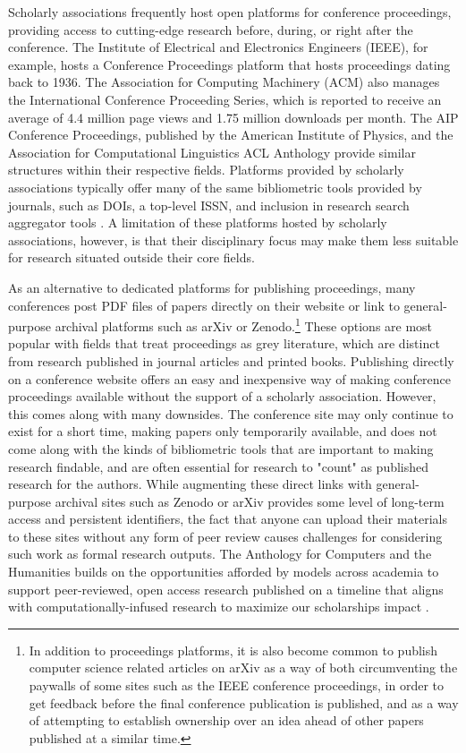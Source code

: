 \documentclass[final]{anthology-ch} %
\begin{document}
Scholarly associations frequently host open platforms for conference
proceedings, providing access to cutting-edge research before, during,
or right after the conference. The Institute of Electrical and
Electronics Engineers (IEEE), for example, hosts a Conference
Proceedings platform that hosts proceedings dating back to 1936. The
Association for Computing Machinery (ACM) also manages the International
Conference Proceeding Series, which is reported to receive an average of
4.4 million page views and 1.75 million downloads per month. The AIP
Conference Proceedings, published by the American Institute of Physics,
and the Association for Computational Linguistics\textquotesingle{} ACL
Anthology provide similar structures within their respective fields.
Platforms provided by scholarly associations typically offer many of the
same bibliometric tools provided by journals, such as DOIs, a top-level
ISSN, and inclusion in research search aggregator tools
\cite{anderson2012towards}. A limitation of
these platforms hosted by scholarly associations, however, is that their
disciplinary focus may make them less suitable for research situated
outside their core fields.

As an alternative to dedicated platforms for publishing proceedings,
many conferences post PDF files of papers directly on their website or
link to general-purpose archival platforms such as arXiv or
Zenodo.\footnote{In addition to proceedings platforms, it is also become
  common to publish computer science related articles on arXiv as a way
  of both circumventing the paywalls of some sites such as the IEEE
  conference proceedings, in order to get feedback before the final
  conference publication is published, and as a way of attempting to
  establish ownership over an idea ahead of other papers published at a
  similar time.} These options are most popular with fields that treat
proceedings as grey literature, which are distinct from research
published in journal articles and printed books. Publishing directly on
a conference website offers an easy and inexpensive way of making
conference proceedings available without the support of a scholarly
association. However, this comes along with many downsides. The
conference site may only continue to exist for a short time, making
papers only temporarily available, and does not come along with the
kinds of bibliometric tools that are important to making research
findable, and are often essential for research to "count" as published
research for the authors. While augmenting these direct links with
general-purpose archival sites such as Zenodo or arXiv provides some
level of long-term access and persistent identifiers, the fact that
anyone can upload their materials to these sites without any form of
peer review causes challenges for considering such work as formal
research outputs. The Anthology for Computers and the Humanities builds
on the opportunities afforded by models across academia to support
peer-reviewed, open access research published on a timeline that aligns
with computationally-infused research to maximize our
scholarship\textquotesingle s impact \cite{bosman2021oa, suber2012open}.
\end{document}
